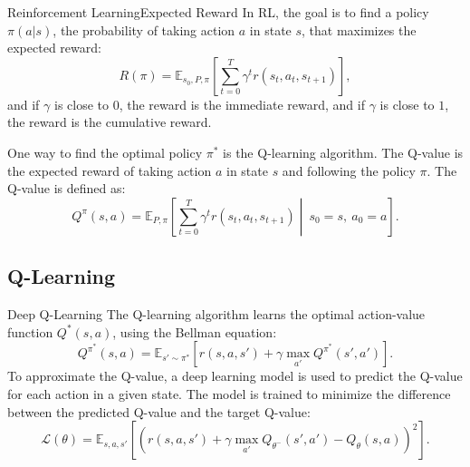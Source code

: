 \begin{frame}{Reinforcement Learning}{Expected Reward}
	In RL, the goal is to find a policy $\pi(a\vert s)$, the probability of taking action $a$ in state $s$, that maximizes the expected reward:
	\begin{equation*}
		R(\pi) = \mathbb{E}_{s_0, P, \pi} \left[ \sum_{t=0}^{T} \gamma^t r(s_t,a_t,s_{t+1}) \right],
	\end{equation*}
	and if $\gamma$ is close to $0$, the reward is the immediate reward,  and if $\gamma$ is close to $1$, the reward is the cumulative reward.

	One way to find the optimal policy $\pi^*$ is the Q-learning algorithm. The Q-value is the expected reward of taking action $a$ in state $s$ and following the policy $\pi$. The Q-value is defined as:
	\begin{equation*}
		Q^\pi(s,a) = \mathbb{E}_{P, \pi} \left[ \sum_{t=0}^{T} \gamma^t r(s_t,a_t,s_{t+1}) \middle\vert\ s_0 = s,\ a_0=a \right].
	\end{equation*}
\end{frame}

\subsection{Q-Learning}
\begin{frame}{}{Deep Q-Learning}
	The Q-learning algorithm learns the optimal action-value function $Q^*(s,a)$, using the Bellman equation:
	\begin{equation*}
		\label{eq:q-learning}
		Q^{\pi^*}(s,a) = \mathbb{E}_{s'\sim \pi^*} \left[ r(s,a,s') + \gamma \max_{a'} Q^{\pi^*}(s',a') \right].
	\end{equation*}
	To approximate the Q-value, a deep learning model is used to predict the Q-value for each action in a given state. The model is trained to minimize the difference between the predicted Q-value and the target Q-value:
	\begin{equation*}
		\label{eq:loss2}
		\mathcal{L}(\theta) = \mathbb{E}_{s,a,s'} \left[ \left( r(s,a,s') + \gamma \max_{a'} Q_{\theta^-}(s',a') - Q_{\theta}(s,a) \right)^2 \right].
	\end{equation*}
\end{frame}

